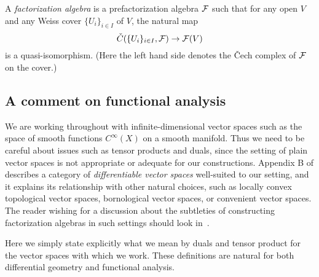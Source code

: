 \begin{dfn}
A \emph{factorization algebra} is a prefactorization algebra $\mathcal F$ such that
for any open $V$ and any Weiss cover $\{U_i\}_{i \in I}$ of $V$,
the natural map
\[
\check{C}(\{U_i\}_{i \in I},\mathcal F) \to \mathcal F(V)
\]
is a quasi-isomorphism.
(Here the left hand side denotes the \v{C}ech complex of $\mathcal F$ on the cover.)
\end{dfn}

\subsection{A comment on functional analysis}
\label{sec functional analysis}

We are working throughout with infinite-dimensional vector spaces 
such as the space of smooth functions $C^\infty(X)$ on a smooth manifold.
Thus we need to be careful about issues such as tensor products and duals,
since the setting of plain vector spaces is not appropriate or adequate for our constructions.
Appendix B of \cite{CG1} describes a category of {\em differentiable vector spaces} well-suited to our setting, 
and it explains its relationship with other natural choices, 
such as locally convex topological vector spaces, bornological vector spaces, or convenient vector spaces.
The reader wishing for a discussion about the subtleties of constructing factorization algebras in such settings should look in~\cite{CG1}.

Here we simply state explicitly what we mean by duals and tensor product for the vector spaces with which we work.
These definitions are natural for both differential geometry and functional analysis.

